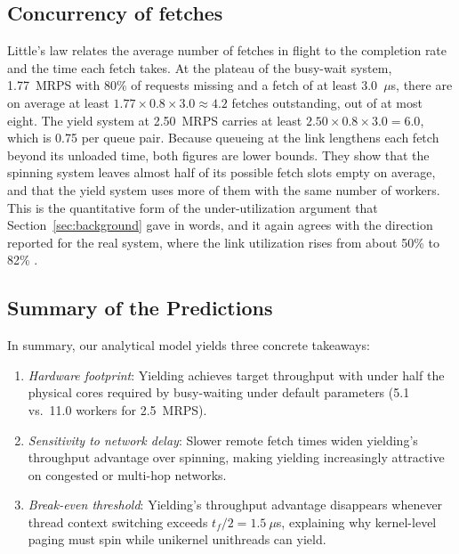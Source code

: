 \subsection{Concurrency of fetches}
Little's law relates the average number of fetches in flight to the completion rate and the time each fetch takes. At the plateau of the busy-wait system, 1.77~MRPS with 80\% of requests missing and a fetch of at least 3.0~$\mu$s, there are on average at least $1.77\times0.8\times3.0\approx4.2$ fetches outstanding, out of at most eight. The yield system at 2.50~MRPS carries at least $2.50\times0.8\times3.0=6.0$, which is 0.75 per queue pair. Because queueing at the link lengthens each fetch beyond its unloaded time, both figures are lower bounds. They show that the spinning system leaves almost half of its possible fetch slots empty on average, and that the yield system uses more of them with the same number of workers. This is the quantitative form of the under-utilization argument that Section~\ref{sec:background} gave in words, and it again agrees with the direction reported for the real system, where the link utilization rises from about 50\% to 82\% \cite{adios}.

\subsection{Summary of the Predictions}
In summary, our analytical model yields three concrete takeaways:
\begin{enumerate}
\item \emph{Hardware footprint}: Yielding achieves target throughput with under half the physical cores required by busy-waiting under default parameters (5.1 vs.\ 11.0 workers for 2.5~MRPS).
\item \emph{Sensitivity to network delay}: Slower remote fetch times widen yielding's throughput advantage over spinning, making yielding increasingly attractive on congested or multi-hop networks.
\item \emph{Break-even threshold}: Yielding's throughput advantage disappears whenever thread context switching exceeds $t_f / 2 = 1.5~\mu$s, explaining why kernel-level paging must spin while unikernel unithreads can yield.
\end{enumerate}
